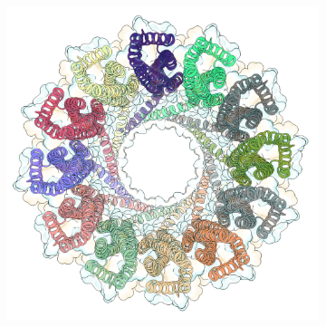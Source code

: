 \begin{figure}[ht!]
\begin{centering}
\begin{subfigure}[t]{\dimexpr.3\linewidth-1.3em\relax}
  \end{subfigure}%
  \begin{subfigure}[t]{\dimexpr.35\linewidth-1.3em\relax}
  \centering
  \includegraphics[width=\linewidth,valign=t]{Figures/clya-top-c.png}
  \end{subfigure}

  \vspace{1.cm}


\end{centering}
\end{figure}
